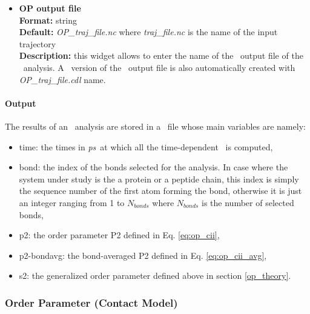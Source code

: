 \documentclass[a4paper,11pt]{report}
\newcommand{\ps}{\textit{ps}}
\begin{document}
\begin{itemize}
\item \textbf{OP output file}\\
\textbf{Format:} string\\
\textbf{Default:} \textit{OP\_traj\_file.nc} where \textit{traj\_file.nc} is the name of the input trajectory\\
\textbf{Description:} this widget allows to enter the name of the \NetCDF\ output file of the \OP\ analysis. A \CDL\ 
version of the \NetCDF\ output file is also automatically created with \textit{OP\_traj\_file.cdl} name.
\end{itemize}

\paragraph{Output\\}
The results of an \OP\ analysis are stored in a \NetCDF\ file whose main variables are namely:
\begin{itemize}
\item time: the times in \ps\ at which all the time-dependent \OP\ is computed,
\item bond: the index of the bonds selected for the analysis. In case where the system under study 
is the a protein or a peptide chain, this index is simply the sequence number of the first atom forming the bond, 
otherwise it is just an integer ranging from 1 to $N_{bonds}$ where $N_{bonds}$ is the number of selected bonds,
\item p2: the order parameter P2 defined in Eq. \ref{eq:op_cii},
\item p2-bondavg: the bond-averaged P2 defined in Eq. \ref{eq:op_cii_avg},
\item s2: the generalized order parameter defined above in section \ref{op_theory}.
\end{itemize}

\subsubsection{Order Parameter (Contact Model)}
\label{opcm}
\end{document}
